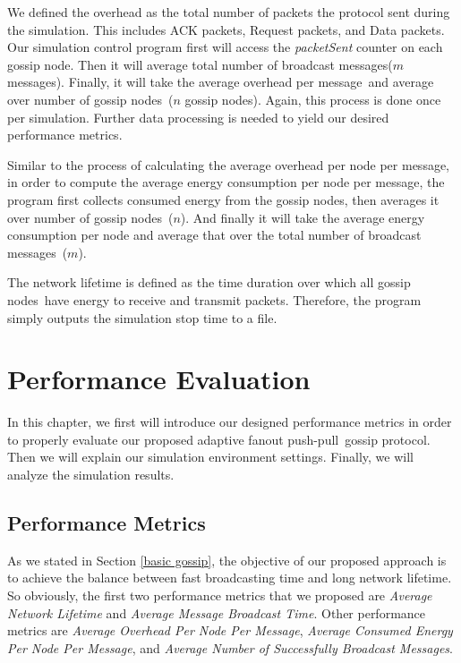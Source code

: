 \documentclass[onehalf,11pt]{beavtex}
\newcommand{\gp}{gossip protocol}
\newcommand{\msgs}{messages}
\newcommand{\msg}{message}
\newcommand{\pp}{push-pull}
\newcommand{\gn}{gossip node}
\newcommand{\gns}{gossip nodes}
\newcommand{\nl}{Network Lifetime}
\begin{document}
We defined the overhead as the total number of packets the protocol sent during the simulation. This includes ACK packets, Request packets, and Data packets. Our simulation control program first will access the \emph{packetSent} counter on each \gn. Then it will average total number of broadcast \msgs ($m$ \msgs). Finally, it will take the average overhead per \msg ~and average over number of \gns ~($n$ gossip nodes). Again, this process is done once per simulation. Further data processing is needed to yield our desired performance metrics.

Similar to the process of calculating the average overhead per node per \msg, in order to compute the average energy consumption per node per \msg, the program first collects consumed energy from the \gns, then averages it over number of \gns ~($n$). And finally it will take the average energy consumption per node and average that over the total number of broadcast \msgs ~($m$). 

The network lifetime is defined as the time duration over which all \gns ~have energy to receive and transmit packets. Therefore, the program simply outputs the simulation stop time to a file.

\chapter{Performance Evaluation}
\label{Chapter5}

In this chapter, we first will introduce our designed performance metrics in order to properly evaluate our proposed adaptive fanout \pp ~\gp. Then we will explain our simulation environment settings. Finally, we will analyze the simulation results.

\section{Performance Metrics} \label{pm}
As we stated in Section \ref{basic gossip}, the objective of our proposed approach is to achieve the balance between fast broadcasting time and long network lifetime. So obviously, the first two performance metrics that we proposed are \emph{Average \nl} and \emph{Average Message Broadcast Time}. Other performance metrics are \emph{Average Overhead Per Node Per Message}, \emph{Average Consumed Energy Per Node Per Message}, and \emph{Average Number of Successfully Broadcast Messages}.
\end{document}

